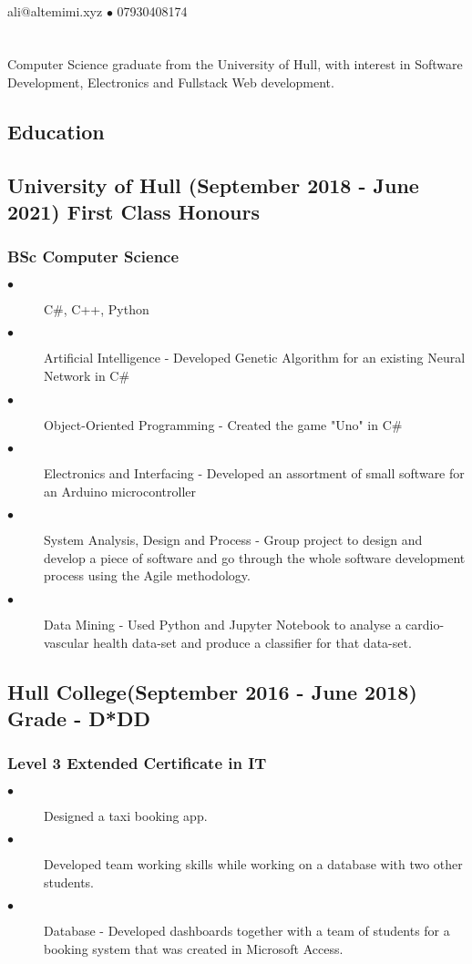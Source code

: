 \documentclass{article}
\author{Ali Al Temimi}
\makeatletter
\renewcommand{\maketitle}{
\begin{center}
    {\huge\bfseries
    \theauthor}
    {\Large \\ali@altemimi.xyz $\bullet$ 07930408174}
    \vspace{-4em}
\end{center}
}
\makeatother
\begin{document}
    \maketitle
\section{}
Computer Science graduate from the University of Hull, with interest in Software Development, Electronics and Fullstack Web development. 
    \begin{multicols}{2}
        \section{Education}
        \subsection{University of Hull (September 2018 - June 2021) First Class Honours}
        \subsubsection{BSc Computer Science}
        \begin{description}
            \item[$\bullet$]C\#, C++, Python
            \item[$\bullet$]Artificial Intelligence - Developed Genetic Algorithm for an existing Neural Network in C\#
            \item[$\bullet$]Object-Oriented Programming - Created the game "Uno" in C\# 
            \item[$\bullet$]Electronics and Interfacing - Developed an assortment of small software for an Arduino microcontroller
            \item[$\bullet$]System Analysis, Design and Process - Group project to design and develop a piece of software and go through the whole software development process using the Agile methodology. 
            \item[$\bullet$]Data Mining - Used Python and Jupyter Notebook to analyse a cardio-vascular health data-set and produce a classifier for that data-set. 
        \end{description}
        \subsection{Hull College(September 2016 - June 2018) Grade - D*DD}
        \subsubsection{Level 3 Extended Certificate in IT}
        \begin{description}
            \item[$\bullet$]Designed a taxi booking app.
            \item[$\bullet$]Developed team working skills while working on a database with two other students. 
            \item[$\bullet$]Database - Developed dashboards together with a team of students for a booking system that was created in Microsoft Access. 
        \end{description}

\end{multicols}
\end{document}
